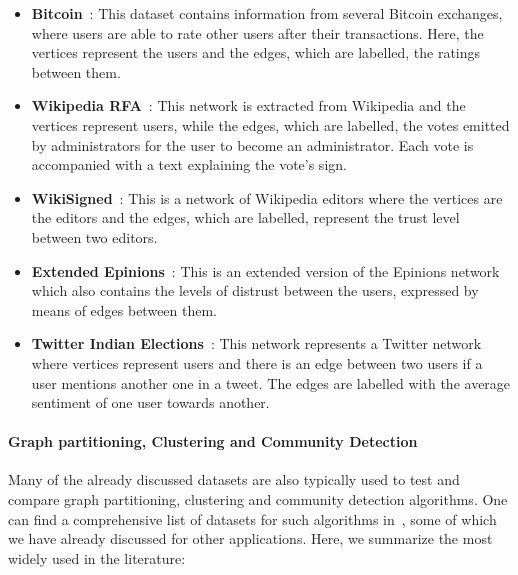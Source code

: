   \begin{itemize}
    \item \textbf{Bitcoin}~\cite{moore2013beware}: This dataset contains information from
      several Bitcoin exchanges, where users are able to rate other users after
      their transactions. Here, the vertices represent the users and the edges,
      which are labelled, the ratings between them.
    \item \textbf{Wikipedia RFA}~\cite{west2014exploiting}: This network is extracted
      from Wikipedia and the vertices represent users, while the
      edges, which are labelled, the votes emitted by administrators for the
      user to become an administrator.  Each vote is accompanied with a text
      explaining the vote's sign.
    \item \textbf{WikiSigned}~\cite{maniu2011building}: This is a network of Wikipedia
      editors where the vertices are the editors and the edges, which are
      labelled, represent the trust level between two editors.
    \item \textbf{Extended Epinions}~\cite{massa2007trust}: This is an extended version of
      the Epinions network which also contains the levels of distrust between the
      users, expressed by means of edges between them.
    \item \textbf{Twitter Indian Elections}~\cite{kagan2015using}: This network represents
      a Twitter network where vertices represent users and there is an edge
      between two users if a user mentions another one in a tweet. The edges
      are labelled with the average sentiment of one user towards another.
  \end{itemize}


\paragraph{Graph partitioning, Clustering and Community Detection}

Many of the already discussed datasets are also typically used to test and
compare graph partitioning, clustering and community detection algorithms. One
can find a comprehensive list of datasets for such algorithms
in~\cite{10dimacs,yang2015defining}, some of which we have already discussed for other
applications. Here, we summarize the most widely used in the literature:

